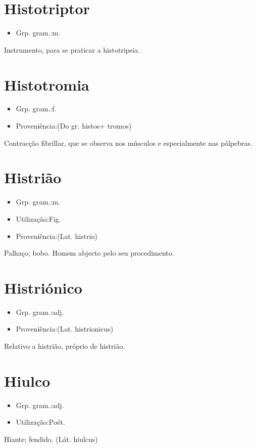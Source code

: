 \documentclass{article}
\begin{document}
\section{Histotriptor}
\begin{itemize}
\item {Grp. gram.:m.}
\end{itemize}
Instrumento, para se praticar a histotripsia.
\section{Histotromia}
\begin{itemize}
\item {Grp. gram.:f.}
\end{itemize}
\begin{itemize}
\item {Proveniência:(Do gr. \textunderscore histos\textunderscore  + \textunderscore tromos\textunderscore )}
\end{itemize}
Contracção fibrillar, que se observa nos músculos e especialmente nas pálpebras.
\section{Histrião}
\begin{itemize}
\item {Grp. gram.:m.}
\end{itemize}
\begin{itemize}
\item {Utilização:Fig.}
\end{itemize}
\begin{itemize}
\item {Proveniência:(Lat. \textunderscore histrio\textunderscore )}
\end{itemize}
Palhaço; bobo.
Homem abjecto pelo seu procedimento.
\section{Histriónico}
\begin{itemize}
\item {Grp. gram.:adj.}
\end{itemize}
\begin{itemize}
\item {Proveniência:(Lat. \textunderscore histrionicus\textunderscore )}
\end{itemize}
Relativo a histrião, próprio de histrião.
\section{Hiulco}
\begin{itemize}
\item {Grp. gram.:adj.}
\end{itemize}
\begin{itemize}
\item {Utilização:Poét.}
\end{itemize}
Hiante; fendido.
(Lát. \textunderscore hiulcus\textunderscore )
\end{document}

